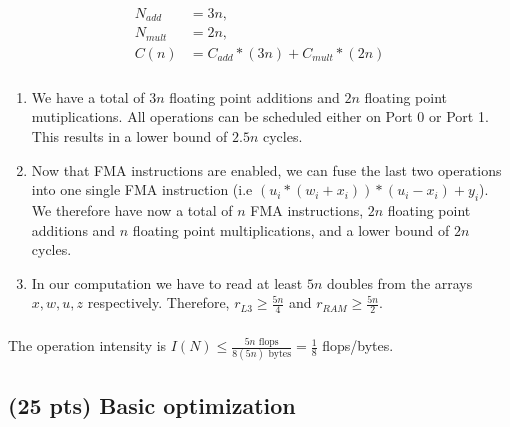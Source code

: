 \documentclass[tikz,14pt,fleqn]{article}
\begin{document}
\subsubsection{} %
\vspace*{-0.5cm}
\begin{align*}
    N_{add} &= 3n,\\
    N_{mult} &= 2n,\\
    C(n) &= C_{add}*(3n) + C_{mult}*(2n)
\end{align*}
\subsubsection{} %
\begin{enumerate}[label=\roman*)]
    \item We have a total of $3n$ floating point additions and $2n$ floating point mutiplications. All operations can be scheduled either on Port 0 or Port 1. This results in a lower bound of $2.5n$ cycles.
    \item Now that FMA instructions are enabled, we can fuse the last two operations into one single FMA instruction (i.e $(u_i*(w_i+x_i))*(u_i-x_i)+y_i$). We therefore have now a total of $n$ FMA instructions, $2n$ floating point additions and $n$ floating point multiplications, and a lower bound of $2n$ cycles.
    \item In our computation we have to read at least $5n$ doubles from the arrays $x,w,u,z$ respectively. Therefore, $r_{L3}\geq \frac{5n}{4}$ and $r_{RAM}\geq \frac{5n}{2}$.  
\end{enumerate}
\subsubsection{} %
The operation intensity is $I(N) \leq \frac{5n\text{ flops}}{8(5n)\text{ bytes}} = \frac{1}{8}$ flops/bytes.

\subsection{(25 pts) Basic optimization}
\end{document}
